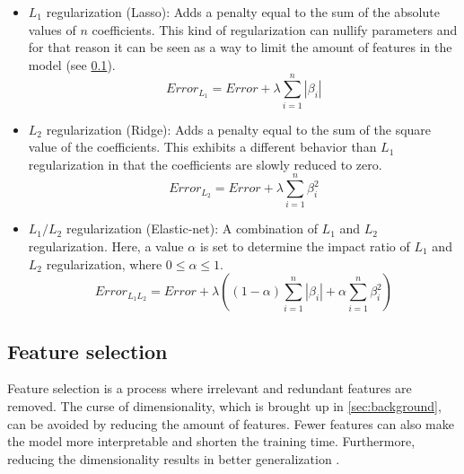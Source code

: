 \begin{itemize}
	\item{$L_1$ regularization (Lasso):} Adds a penalty equal to the sum of the absolute values of $n$ coefficients. This kind of regularization can nullify parameters and for that reason it can be seen as a way to limit the amount of features in the model (see \ref{sec:feature_selection}).
		\begin{equation}
			Error_{L_1} = Error + \lambda \sum_{i=1}^{n}|\beta_i| 
		\end{equation}
	\item{$L_2$ regularization (Ridge):} Adds a penalty equal to the sum of the square value of the coefficients. This exhibits a different behavior than $L_1$ regularization in that the coefficients are slowly reduced to zero.
		\begin{equation}
			Error_{L_2} = Error + \lambda \sum_{i=1}^{n}\beta_i^2 
		\end{equation}
	\item{$L_1/L_2$ regularization (Elastic-net):} A combination of $L_1$ and $L_2$ regularization. Here, a value $\alpha$ is set to determine the impact ratio of $L_1$ and $L_2$ regularization, where $0 \leq \alpha \leq 1$.
 		\begin{equation}
			Error_{L_1L_2} = Error + \lambda ( (1-\alpha)\sum_{i=1}^{n}|\beta_i| + \alpha  \sum_{i=1}^{n}\beta_i^2 ) 
		\end{equation}
\end{itemize}

	\subsection{Feature selection} \label{sec:feature_selection}
		Feature selection is a process where irrelevant and redundant features are removed. The curse of dimensionality, which is brought up in \ref{sec:background}, can be avoided by reducing the amount of features. Fewer features can also make the model more interpretable and shorten the training time. Furthermore, reducing the dimensionality results in better generalization \cite{ARTICLE:10}.  
	


